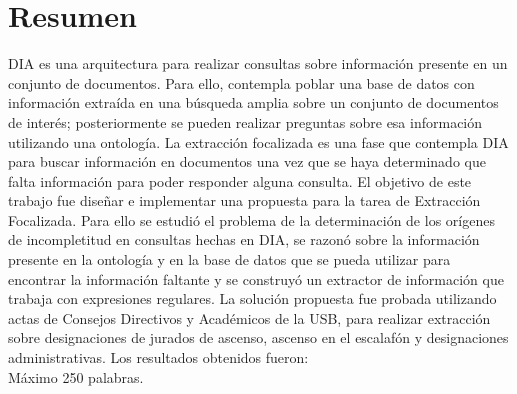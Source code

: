 \setcounter{page}{4}
\chapter*{Resumen}

DIA es una arquitectura para realizar consultas sobre información presente en un conjunto de documentos. Para ello, contempla poblar una base de datos con información extraída en una búsqueda amplia sobre un conjunto de documentos de interés; posteriormente se pueden realizar preguntas sobre esa información utilizando una ontología. La extracción focalizada es una fase que contempla DIA para buscar información en documentos una vez que se haya determinado que falta información para poder responder alguna consulta. El objetivo de este trabajo fue diseñar e implementar una propuesta para la tarea de Extracción Focalizada. Para ello se estudió el problema de la determinación de los orígenes de incompletitud en consultas hechas en DIA, se razonó sobre la información presente en la ontología y en la base de datos que se pueda utilizar para encontrar la información faltante y se construyó un extractor de información que trabaja con expresiones regulares. La solución propuesta fue probada utilizando actas de Consejos Directivos y Académicos de la USB, para realizar extracción sobre designaciones de jurados de ascenso, ascenso en el escalafón y designaciones administrativas. Los resultados obtenidos fueron: \\

Máximo 250 palabras.

\newpage

